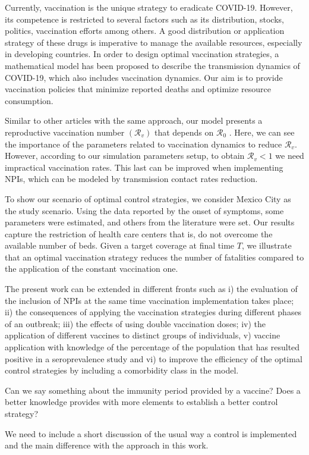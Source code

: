 Currently, vaccination is the unique strategy to eradicate COVID-19.
However, its competence is restricted to several factors such as its
distribution, stocks, politics, vaccination efforts among others.
A good distribution or application strategy of these drugs is imperative to
manage the available resources, especially in developing countries. In order
to design optimal vaccination strategies, a mathematical model has been
proposed to describe the transmission dynamics of COVID-19, which also
includes vaccination dynamics. Our aim is to provide vaccination policies that
minimize reported deaths and optimize resource consumption.

Similar to other articles with the same approach, our model presents a
reproductive vaccination number $(\mathcal{R}_{v})$ that depends on
$\mathcal{R}_{0}$ \cite{Alexander2004}. Here, we can see the importance of the
parameters related to vaccination dynamics to reduce $\mathcal{R}_{v}$.
However, according to our simulation parameters setup, to obtain
$\mathcal{R}_{v} < 1$ we need impractical vaccination rates. This last can be
improved when implementing NPIs, which can be modeled by transmission contact
rates reduction.

To show our scenario of optimal control strategies, we consider Mexico City as
the study scenario. Using the data reported by the onset of symptoms, some
parameters were estimated, and others from the literature were set. Our results
capture the restriction of health care centers that is, do not overcome the
available number of beds. Given a target coverage at final time $T$, we
illustrate that an optimal vaccination strategy reduces the number of fatalities
compared to the application of the constant vaccination one.

The present work can be extended in different fronts such as i) the evaluation
of the inclusion of NPIs at the same time vaccination implementation takes
place; ii) the consequences of applying the vaccination strategies during
different phases of an outbreak; iii) the effects of using double vaccination
doses; iv) the application of different vaccines to distinct groups of
individuals, v) vaccine application with knowledge of the percentage of the
population that has resulted positive in a seroprevalence study and vi) to
improve the efficiency of the optimal control strategies by including a
comorbidity class in the model.

Can we say something about the immunity period provided by a vaccine? Does a
better knowledge provides with more elements to establish a better control
strategy?

We need to include a short discussion of the usual way a control is implemented
and the main difference with the approach in this work.